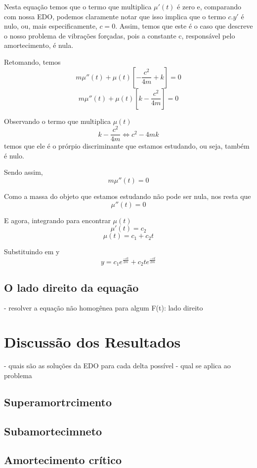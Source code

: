 \documentclass[]{article}
\begin{document}
Nesta equação temos que o termo que multiplica $\mu '(t)$ é zero e, comparando com nossa EDO, podemos claramente 
notar que isso implica que o termo $c.y'$ é  nulo, ou, mais especificamente, $c=0$. 
Assim, temos que este é o caso que descreve o nosso problema de vibrações 
forçadas, pois a constante c, responsável pelo amortecimento, é nula.

Retomando, temos
\[m\mu ''(t) + \mu (t) [ - \frac{c^2}{4m} + k] = 0\]
\[m\mu ''(t) + \mu (t) [k - \frac{c^2}{4m}] = 0\]

Observando o termo que multiplica $\mu(t)$
\[ k - \frac{c^2}{4m} \Leftrightarrow c^2 - 4mk\]
temos que ele é o prórpio discriminante que estamos estudando, ou seja, também é nulo.

Sendo assim, 
\[m\mu ''(t) = 0\]

Como a massa do objeto que estamos estudando não pode ser nula, nos resta que
\[\mu ''(t) = 0\]

E agora, integrando para encontrar $\mu(t)$
\[\mu '(t) = c_2\]
\[\mu (t) = c_1 + c_2t\]

Substituindo em y
\[ y= c_1e^{\frac{-ct}{2m}} + c_2te^{\frac{-ct}{2m}}\]
\subsection{O lado direito da equação}

- resolver a equação não homogênea para algum F(t): lado direito

\pagebreak

\section{Discussão dos Resultados}

- quais são as soluções da EDO para cada delta possível
- qual se aplica ao problema

\subsection{Superamortrcimento}

\subsection{Subamortecimneto}

\subsection{Amortecimento crítico}
\end{document}
